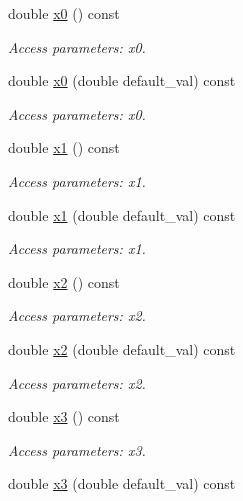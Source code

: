 \begin{DoxyCompactItemize}
double \hyperlink{struct_d_d4hep_1_1_x_m_l_1_1_dimension_a35264d351ee612a6c98be0d884ff4ad6}{x0} () const
\begin{DoxyCompactList}\small\item\em Access parameters\+: x0. \end{DoxyCompactList}\item 
double \hyperlink{struct_d_d4hep_1_1_x_m_l_1_1_dimension_af9f958b21cd45072fca22d29a6dd86b4}{x0} (double default\+\_\+val) const
\begin{DoxyCompactList}\small\item\em Access parameters\+: x0. \end{DoxyCompactList}\item 
double \hyperlink{struct_d_d4hep_1_1_x_m_l_1_1_dimension_a6ba1cf49b1320c22f96e3be85916e8c5}{x1} () const
\begin{DoxyCompactList}\small\item\em Access parameters\+: x1. \end{DoxyCompactList}\item 
double \hyperlink{struct_d_d4hep_1_1_x_m_l_1_1_dimension_ae83beabaeed3cee7a874dd16e09088fa}{x1} (double default\+\_\+val) const
\begin{DoxyCompactList}\small\item\em Access parameters\+: x1. \end{DoxyCompactList}\item 
double \hyperlink{struct_d_d4hep_1_1_x_m_l_1_1_dimension_a51f12fbb1b0f24e738c7ff62009ad93b}{x2} () const
\begin{DoxyCompactList}\small\item\em Access parameters\+: x2. \end{DoxyCompactList}\item 
double \hyperlink{struct_d_d4hep_1_1_x_m_l_1_1_dimension_a6a546b24047fc608e7cb60e740f1b93f}{x2} (double default\+\_\+val) const
\begin{DoxyCompactList}\small\item\em Access parameters\+: x2. \end{DoxyCompactList}\item 
double \hyperlink{struct_d_d4hep_1_1_x_m_l_1_1_dimension_aa6b66813bfe9de86719ca3b1826a9f73}{x3} () const
\begin{DoxyCompactList}\small\item\em Access parameters\+: x3. \end{DoxyCompactList}\item 
double \hyperlink{struct_d_d4hep_1_1_x_m_l_1_1_dimension_a8ec7375d13124ceccac0930e3116b9dd}{x3} (double default\+\_\+val) const

\end{DoxyCompactItemize}
